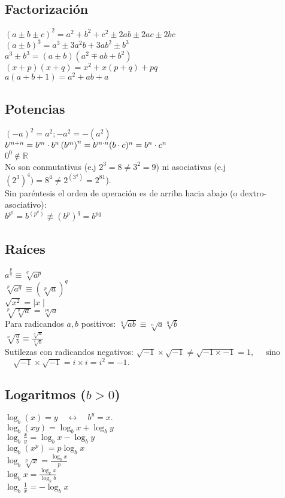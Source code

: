 \subsection*{Factorización}
$ (a \pm b \pm c)^2 = a^2 + b^2 + c^2 \pm 2ab \pm 2ac \pm 2bc $\\
$(a \pm b)^3 = a^3 \pm 3a^2b + 3ab^2 \pm b^3$\\
$ a^3 \pm b^3 = (a \pm b)(a^2 \mp ab + b^2)$\\
$ (x + p)(x + q) = x^2 + x(p + q) + pq $\\
$ a (a + b + 1) = a^2 + ab + a $\\
\vfill\null
\columnbreak
\subsection*{Potencias}
$ (-a)^2 = a^2; -a^2 = -(a^2)$\\
$b^{m + n} = b^m \cdot b^n \\
\left(b^m\right)^n = b^{m \cdot n} \\
(b \cdot c)^n = b^n \cdot c^n$\\
$ 0^0 \notin \mathbb{R}$\\
No son conmutativas (e.j $2^3 = 8 \neq 3^2 = 9$) ni asociativas (e.j $(2^3)^4) = 8^4 \neq 2^{(3^4)} = 2^{81}$).\\
Sin paréntesis el orden de operación es de arriba hacia abajo (o dextro-asociativo):\\
$b^{p^q} = b^{\left(p^q\right)} \not\equiv \left(b^p\right)^q = b^{p q}$\\

\subsection*{Raíces}
$ a ^ {\frac{p}{q}} \equiv \sqrt[q]{a^p} $\\
$ \sqrt[p]{a^q} \equiv (\sqrt[p]{a})^q $\\
$\sqrt{x^2} = \mid x \mid$\\
$\sqrt[p]{\sqrt[q]{a}} = \sqrt[pq]{a}$\\
Para radicandos $a, b$ positivos:
$\sqrt[n]{ab} \equiv \sqrt[n]{a} \sqrt[n]{b}$\\
$\sqrt[n]{\frac{a}{b}} \equiv \frac{\sqrt[n]{a}}{\sqrt[n]{b}}$\\
Sutilezas con radicandos negativos:
$\sqrt{-1}\times\sqrt{-1} \neq \sqrt{-1 \times -1} = 1,\quad$ sino $\quad\sqrt{-1}\times\sqrt{-1} = i \times i = i^2 = -1.$\\

\subsection*{Logaritmos ($b > 0$)}
$\log_b(x) = y \quad \leftrightarrow \quad b^y = x.$\\
$\log_b(xy) = \log_b x + \log_b y$\\
$\log_b \!\frac{x}{y} = \log_b x - \log_b y$\\
$\log_b\left(x^p\right) = p \log_b x$\\
$\log_b \sqrt[p]{x} = \frac{\log_b x}{p}$\\
$\log_b x = \frac{\log_k x}{\log_k b}$\\
$\log_b \frac{1}{x} = -\log_b x$
